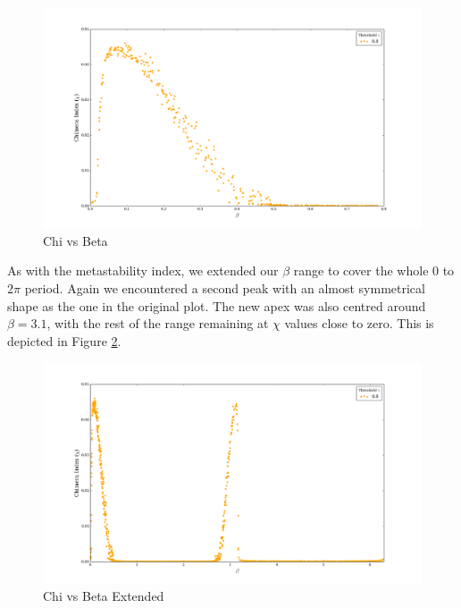 \documentclass[a4paper,11pt]{article}
\begin{document}
\begin{figure}[H]
\begin{center}
\includegraphics[scale = 0.35]{figures/chi_vs_beta_orig}
\end{center}
\caption{
	Chi vs Beta
	\label{fig:chi-vs-beta-orig}
}
\end{figure}

As with the metastability index, we extended our $\beta$ range to cover the whole $0$ to $2\pi$ period. Again we encountered a second peak with an almost symmetrical shape as the one in the original plot. The new apex was also centred around $\beta = 3.1$, with the rest of the range remaining at $\chi$ values close to zero. This is depicted in Figure \ref{fig:chi-vs-beta-ext}.

\begin{figure}[H]
\begin{center}
\includegraphics[scale = 0.35]{figures/chi_vs_beta_ext}
\caption{
	Chi vs Beta Extended
	\label{fig:chi-vs-beta-ext}
}
\end{center}
\end{figure}
\end{document}

